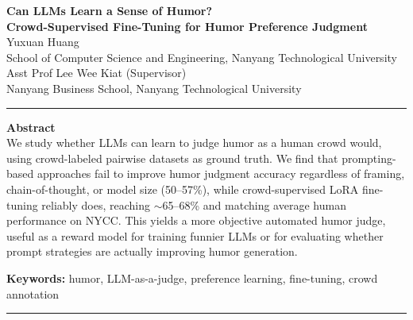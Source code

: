 \documentclass[10pt, a4paper]{article}
\begin{document}
\begin{center}
{\large\bfseries Can LLMs Learn a Sense of Humor?\\
Crowd-Supervised Fine-Tuning for Humor Preference Judgment}\\[0.8em]
Yuxuan Huang\\
{\small School of Computer Science and Engineering, Nanyang Technological University}\\[0.4em]
Asst Prof Lee Wee Kiat (Supervisor)\\
{\small Nanyang Business School, Nanyang Technological University}
\end{center}

\vspace{0.4em}
\noindent\hrule
\vspace{0.4em}

{\small
\noindent\textbf{Abstract} \vspace{0.4em}
\\
We study whether LLMs can learn to judge humor as a human crowd would, using crowd-labeled pairwise datasets as ground truth. We find that prompting-based approaches fail to improve humor judgment accuracy regardless of framing, chain-of-thought, or model size (50--57\%), while crowd-supervised LoRA fine-tuning reliably does, reaching $\sim$65--68\% and matching average human performance on NYCC. This yields a more objective automated humor judge, useful as a reward model for training funnier LLMs or for evaluating whether prompt strategies are actually improving humor generation.

\smallskip
\noindent\textbf{Keywords:} humor, LLM-as-a-judge, preference learning, fine-tuning, crowd annotation
}

\vspace{0.4em}
\noindent\hrule
\vspace{0.8em}
\end{document}

